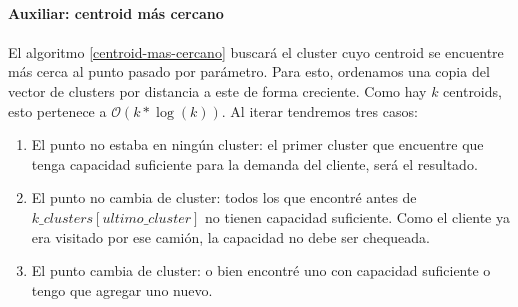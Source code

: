 \paragraph{Auxiliar: centroid más cercano}
\paragraph{} El algoritmo \ref{centroid-mas-cercano} buscará el cluster cuyo centroid se encuentre más cerca al punto pasado por parámetro. Para esto, ordenamos una copia del vector de clusters por distancia a este de forma creciente. Como hay $k$ centroids, esto pertenece a $\mathcal{O}(k*\log(k))$.  Al iterar tendremos tres casos:
\begin{enumerate}
	\item El punto no estaba en ningún cluster: el primer cluster que encuentre que tenga capacidad suficiente para la demanda del cliente, será el resultado.
	\item El punto no cambia de cluster: todos los que encontré antes de $k\_clusters[ultimo\_cluster]$ no tienen capacidad suficiente. Como el cliente ya era visitado por ese camión, la capacidad no debe ser chequeada.
	\item El punto cambia de cluster: o bien encontré uno con capacidad suficiente o tengo que agregar uno nuevo.
\end{enumerate} 
